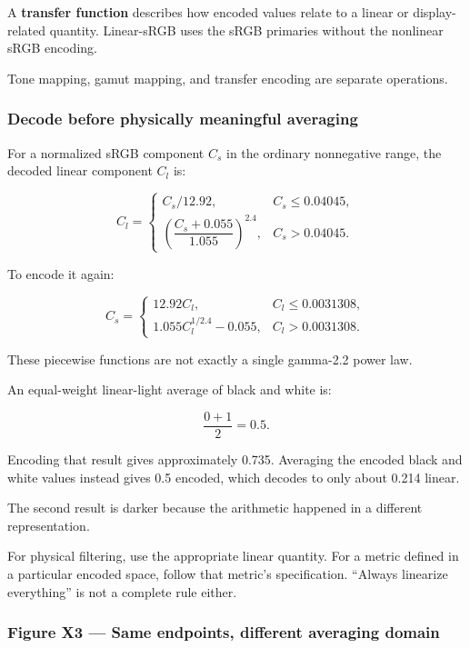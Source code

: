 A \textbf{transfer function} describes how encoded values relate to a linear or display-related quantity. Linear-sRGB uses the sRGB primaries without the nonlinear sRGB encoding.

Tone mapping, gamut mapping, and transfer encoding are separate operations.

\subsubsection{Decode before physically meaningful averaging}\label{04-visual-computing-ii-ch043-decode-before-physically-meaningful-averaging}

\hypertarget{04-visual-computing-ii-ch043-decode-before-physically-meaningful-averaging}{}

For a normalized sRGB component \(C_s\) in the ordinary nonnegative range, the decoded linear component \(C_l\) is:

\[
C_l=
\begin{cases}
C_s/12.92,&C_s\leq0.04045,\\
\left(\dfrac{C_s+0.055}{1.055}\right)^{2.4},
&C_s>0.04045.
\end{cases}
\]

To encode it again:

\[
C_s=
\begin{cases}
12.92C_l,&C_l\leq0.0031308,\\
1.055C_l^{1/2.4}-0.055,&C_l>0.0031308.
\end{cases}
\]

These piecewise functions are not exactly a single gamma-2.2 power law.

An equal-weight linear-light average of black and white is:

\[
\frac{0+1}{2}=0.5.
\]

Encoding that result gives approximately 0.735. Averaging the encoded black and white values instead gives 0.5 encoded, which decodes to only about 0.214 linear.

The second result is darker because the arithmetic happened in a different representation.

For physical filtering, use the appropriate linear quantity. For a metric defined in a particular encoded space, follow that metric's specification. ``Always linearize everything'' is not a complete rule either.

\subsubsection{Figure X3 --- Same endpoints, different averaging domain}\label{04-visual-computing-ii-ch043-figure-x3-same-endpoints-different-averaging-domain}

